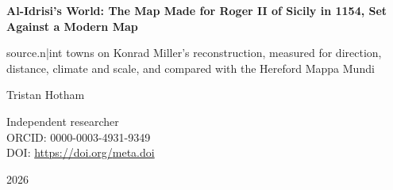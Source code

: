 \documentclass[11pt,a4paper]{article}
\begin{document}
\begin{center}
{\Large\bfseries Al-Idrisi's World: The Map Made for Roger II of Sicily in 1154, Set Against a Modern Map\par}
\vspace{0.4em}
{\large {{source.n|int}} towns on Konrad Miller's reconstruction, measured for direction, distance, climate and scale, and compared with the Hereford Mappa Mundi\par}
\vspace{1.2em}
{\large Tristan Hotham\par}
\vspace{0.3em}
{\small Independent researcher\\
ORCID: 0000-0003-4931-9349\\
DOI: \href{https://doi.org/{{meta.doi}}}{https://doi.org/{{meta.doi}}}\par}
\vspace{0.8em}
2026
\end{center}
\end{document}
